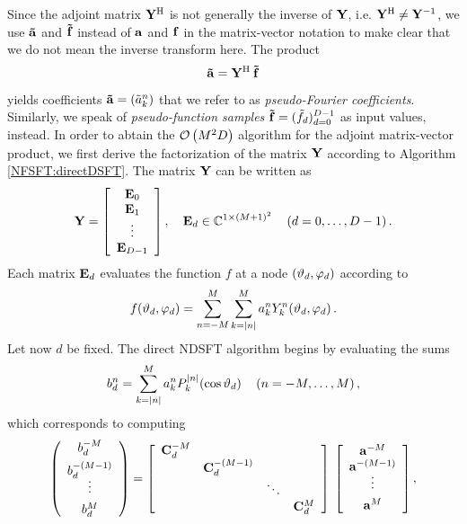 Since the adjoint matrix $\mathbf{Y}^{\text{\rm{H}}}$ is not generally the inverse of $\mathbf{Y}$, i.e. $\mathbf{Y}^{\text{\rm{H}}} 
\neq \mathbf{Y}^{-1}$, we use $\mathbf{\tilde{a}}$ and $\mathbf{\tilde{f}}$ instead of $\mathbf{a}$ and $\mathbf{f}$ 
in the matrix-vector notation to make clear 
that we do not mean the inverse transform here. The product
\[
  \mathbf{\tilde{a}} = \mathbf{Y}^{\text{\rm{H}}} \: \mathbf{\tilde{f}}
\]
yields coefficients $\mathbf{\tilde{a}} = \left(\tilde{a}_{k}^n\right)$ that 
we refer to as \emph{pseudo-Fourier coefficients}. Similarly, we speak of
\emph{pseudo-function samples} $\mathbf{\tilde{f}} = (\tilde{f}_{d})_{d=0}^{D-1}$ as input values,
instead.
In order to abtain the $\mathcal{O}\left(M^2D\right)$ algorithm for the adjoint matrix-vector product, 
we first derive the factorization of the matrix $\mathbf{Y}$ according to Algorithm 
\ref{NFSFT:directDSFT}. The matrix $\mathbf{Y}$ can be written as
\[
  \mathbf{Y} = 
    \left[\begin{array}{c}
      \mathbf{E}_{0}\\
      \mathbf{E}_{1}\\
      \vdots\\
      \mathbf{E}_{D-1}
    \end{array}\right], \quad \mathbf{E}_{d} \in \mathbb{C}^{1 \times (M+1)^2} \quad \left(d=0,\ldots,D-1\right).
\]
Each matrix $\mathbf{E}_{d}$ evaluates the function $f$ at a node $\left(\vartheta_{d},\varphi_{d}\right)$ according to 
\[
  f{\hspace{-0.4ex}}\left(\vartheta_{d},\varphi_{d}\right) = \sum_{n=-M}^M \sum_{k=\left\vert n\right\vert}^M a_k^n Y_{k}^n{\hspace{-0.4ex}}\left(\vartheta_{d},\varphi_{d}\right).
\]
Let now $d$ be fixed. The direct NDSFT algorithm begins by evaluating the sums
\[
  b^{n}_{d} = \sum_{k=\left\vert n\right\vert}^M a_{k}^n P_{k}^{\left\vert n\right\vert}{\hspace{-0.4ex}}\left(\cos\vartheta_{d}\right) \quad \left(n=-M,\ldots,M\right), 
\]
which corresponds to computing
\[
  \left(\begin{array}{c}
    b^{-M}_{d}\\[1ex]
    b^{-(M-1)}_{d}\\[-1ex]
    \vdots\\[1ex]
    b^{M}_{d}
  \end{array}\right)
  =
  \left[\begin{array}{cccc}
    \mathbf{C}^{-M}_{d} &                    &        &               \\
                   & \mathbf{C}^{-(M-1)}_{d} &        &               \\
                   &                    & \ddots &               \\
                   &                    &        & \mathbf{C}^{M}_{d} 
  \end{array}\right]
  \:
  \left[\begin{array}{c}
    \mathbf{a}^{-M}\\
    \mathbf{a}^{-(M-1)}\\[-1ex]
    \vdots\\[1ex]
    \mathbf{a}^{M}
  \end{array}\right],
\]
